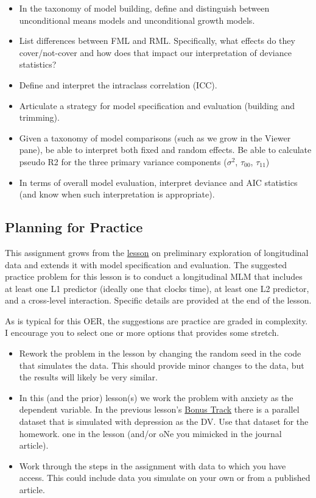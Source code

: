 \documentclass[
  11pt,
]{book}
\providecommand{\tightlist}{%
  \setlength{\itemsep}{0pt}\setlength{\parskip}{0pt}}
\begin{document}
\begin{itemize}
\tightlist
\item
  In the taxonomy of model building, define and distinguish between unconditional means models and unconditional growth models.
\item
  List differences between FML and RML. Specifically, what effects do they cover/not-cover and how does that impact our interpretation of deviance statistics?
\item
  Define and interpret the intraclass correlation (ICC).
\item
  Articulate a strategy for model specification and evaluation (building and trimming).
\item
  Given a taxonomy of model comparisons (such as we grow in the Viewer pane), be able to interpret both fixed and random effects. Be able to calculate pseudo R2 for the three primary variance components (\(\sigma^2\), \(\tau _{00}\), \(\tau _{11}\))
\item
  In terms of overall model evaluation, interpret deviance and AIC statistics (and know when such interpretation is appropriate).
\end{itemize}

\hypertarget{planning-for-practice-2}{%
\subsection{Planning for Practice}\label{planning-for-practice-2}}

This assignment grows from the \protect\hyperlink{MLMexplore}{lesson} on preliminary exploration of longitudinal data and extends it with model specification and evaluation. The suggested practice problem for this lesson is to conduct a longitudinal MLM that includes at least one L1 predictor (ideally one that clocks time), at least one L2 predictor, and a cross-level interaction. Specific details are provided at the end of the lesson.

As is typical for this OER, the suggestions are practice are graded in complexity. I encourage you to select one or more options that provides some stretch.

\begin{itemize}
\tightlist
\item
  Rework the problem in the lesson by changing the random seed in the code that simulates the data. This should provide minor changes to the data, but the results will likely be very similar.
\item
  In this (and the prior) lesson(s) we work the problem with anxiety as the dependent variable. In the previous lesson's \protect\hyperlink{MLMexplore}{Bonus Track} there is a parallel dataset that is simulated with depression as the DV. Use that dataset for the homework. one in the lesson (and/or oNe you mimicked in the journal article).
\item
  Work through the steps in the assignment with data to which you have access. This could include data you simulate on your own or from a published article.
\end{itemize}
\end{document}
